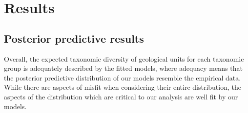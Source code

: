 \documentclass[12pt,letterpaper]{article}
\begin{document}
\section{Results}

\subsection{Posterior predictive results}



Overall, the expected taxonomic diversity of geological units for each taxonomic group is adequately described by the fitted models, where adequacy means that the posterior predictive distribution of our models resemble the empirical data. While there are aspects of misfit when considering their entire distribution, the aspects of the distribution which are critical to our analysis are well fit by our models.
\end{document}

